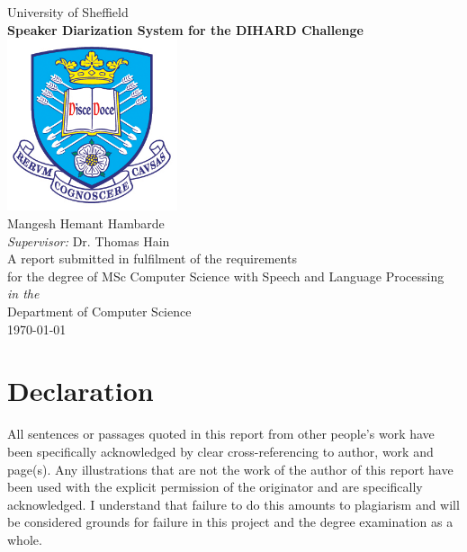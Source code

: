 \documentclass[12pt,oneside]{book}
\begin{document}
\frontmatter

\begin{titlepage}


\begin{center}
{\LARGE University of Sheffield}\\[1.5cm]
\linespread{1.2}\huge {\bfseries Speaker Diarization System for the DIHARD Challenge}\\[1.5cm]
\linespread{1}
\includegraphics[width=5cm]{images/tuoslogo.png}\\[1cm]
{\Large Mangesh Hemant Hambarde}\\[1cm]
{\large \emph{Supervisor:} Dr. Thomas Hain}\\[1cm]
\large A report submitted in fulfilment of the requirements\\ for the degree of MSc Computer Science with Speech and Language Processing\\[0.3cm] 
\textit{in the}\\[0.3cm]
Department of Computer Science\\[0.5cm]
\today
\end{center}

\end{titlepage}


\newpage
\chapter*{\Large Declaration}


All sentences or passages quoted in this report from other people's work have been specifically acknowledged by clear cross-referencing to author, work and page(s). Any illustrations that are not the work of the author of this report have been used with the explicit permission of the originator and are specifically acknowledged. I understand that failure to do this amounts to plagiarism and will be considered grounds for failure in this project and the degree examination as a whole.\\[1cm]
\end{document}
